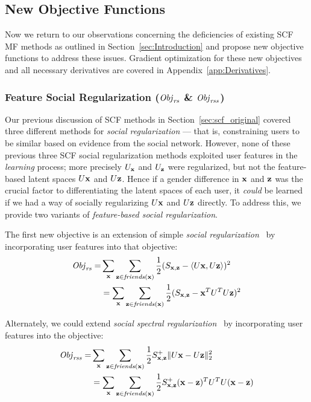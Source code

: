 \subsection{New Objective Functions}

Now we return to our observations concerning the deficiencies of
existing SCF MF methods as outlined in Section~\ref{sec:Introduction}
and propose new objective functions to address these issues.  
Gradient optimization for these new objectives and all necessary derivatives 
are covered in Appendix~\ref{app:Derivatives}.

\subsubsection{Feature Social Regularization ($\mathit{Obj}_{\mathit{rs}}$ \& $\mathit{Obj}_{\mathit{rss}}$)}
\label{sec:SocRec}

Our previous discussion of SCF methods in Section~\ref{sec:scf_original}
covered three different methods for \emph{social regularization} --- that is,
constraining users to be similar based on evidence from the social network.
However, none of these previous three SCF social regularization methods
exploited user features in the \emph{learning} process; more precisely 
$U_{\mathbf{x}}$ and $U_{\mathbf{z}}$ were regularized, but not the feature-based latent
spaces $U\mathbf{x}$ and $U\mathbf{z}$.  Hence if a gender difference in $\mathbf{x}$ and $\mathbf{z}$ was the
crucial factor to differentiating the latent spaces of each user, it \emph{could} 
be learned if we had a way of socially regularizing $U\mathbf{x}$ and $U\mathbf{z}$
directly.  To address this, we provide two variants of 
\emph{feature-based social regularization}.

The first new objective is an extension of simple 
\emph{social regularization}~\cite{lla,socinf} by incorporating user
features into that objective:
\begin{align}
\mathit{Obj}_{\mathit{rs}} = & \sum_{\mathbf{x}} \sum_{\mathbf{z} \in \mathit{friends}(\mathbf{x})} \frac{1}{2} (S_{\mathbf{x},\mathbf{z}} - \langle U\mathbf{x}, U\mathbf{z} \rangle)^2 \\
& = \sum_{\mathbf{x}} \sum_{\mathbf{z} \in \mathit{friends}(\mathbf{x})} \frac{1}{2} (S_{\mathbf{x},\mathbf{z}} - \mathbf{x}^T U^T U \mathbf{z})^2 \nonumber 
\end{align}


Alternately, we could extend \emph{social spectral
regularization}~\cite{sr,rrmf} by incorporating user features into the
objective:
\begin{align}
\mathit{Obj}_{\mathit{rss}} = & \sum_{\mathbf{x}} \sum_{\mathbf{z} \in \mathit{friends}(\mathbf{x})} \frac{1}{2} S^+_{\mathbf{x},\mathbf{z}} \| U\mathbf{x} - U\mathbf{z} \|_2^2 \\
& = \sum_{\mathbf{x}} \sum_{\mathbf{z} \in \mathit{friends}(\mathbf{x})} \frac{1}{2} S^+_{\mathbf{x},\mathbf{z}} (\mathbf{x} - \mathbf{z})^T U^T U (\mathbf{x} - \mathbf{z}) \nonumber
\end{align}

